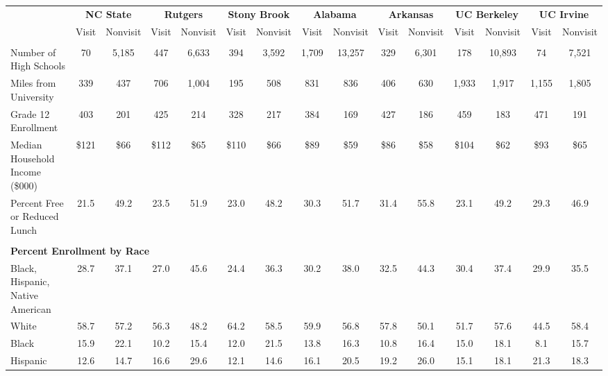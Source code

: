 \begin{tabular*}{\linewidth}{@{\extracolsep{\fill} } lcccccccccccccc}%
&\multicolumn{2}{c}{\bfseries NC State}&\multicolumn{2}{c}{\bfseries Rutgers}&\multicolumn{2}{c}{\bfseries Stony Brook}&\multicolumn{2}{c}{\bfseries Alabama}&\multicolumn{2}{c}{\bfseries Arkansas}&\multicolumn{2}{c}{\bfseries UC Berkeley}&\multicolumn{2}{c}{\bfseries UC Irvine}\\%
&Visit&\multicolumn{1}{l}{Nonvisit}&Visit&\multicolumn{1}{l}{Nonvisit}&Visit&\multicolumn{1}{l}{Nonvisit}&Visit&\multicolumn{1}{l}{Nonvisit}&Visit&\multicolumn{1}{l}{Nonvisit}&Visit&\multicolumn{1}{l}{Nonvisit}&Visit&\multicolumn{1}{l}{Nonvisit}\\%
\hline%
&&&&&&&&&&&&&&\\%
\hspace{0cm}Number of High Schools&70&5,185&447&6,633&394&3,592&1,709&13,257&329&6,301&178&10,893&74&7,521\\%
\hspace{0cm}Miles from University&339&437&706&1,004&195&508&831&836&406&630&1,933&1,917&1,155&1,805\\%
\hspace{0cm}Grade 12 Enrollment&403&201&425&214&328&217&384&169&427&186&459&183&471&191\\%
\hspace{0cm}Median Household Income (\$000)&\$121&\$66&\$112&\$65&\$110&\$66&\$89&\$59&\$86&\$58&\$104&\$62&\$93&\$65\\%
\hspace{0cm}Percent Free or Reduced Lunch&21.5&49.2&23.5&51.9&23.0&48.2&30.3&51.7&31.4&55.8&23.1&49.2&29.3&46.9\\%
&&&&&&&&&&&&&&\\%
\multicolumn{15}{l}{\bfseries Percent Enrollment by Race}\\%
\hspace{0.2cm}Black, Hispanic, Native American&28.7&37.1&27.0&45.6&24.4&36.3&30.2&38.0&32.5&44.3&30.4&37.4&29.9&35.5\\%
\hspace{0.2cm}White&58.7&57.2&56.3&48.2&64.2&58.5&59.9&56.8&57.8&50.1&51.7&57.6&44.5&58.4\\%
\hspace{0.2cm}Black&15.9&22.1&10.2&15.4&12.0&21.5&13.8&16.3&10.8&16.4&15.0&18.1&8.1&15.7\\%
\hspace{0.2cm}Hispanic&12.6&14.7&16.6&29.6&12.1&14.6&16.1&20.5&19.2&26.0&15.1&18.1&21.3&18.3\\%

\end{tabular*}
